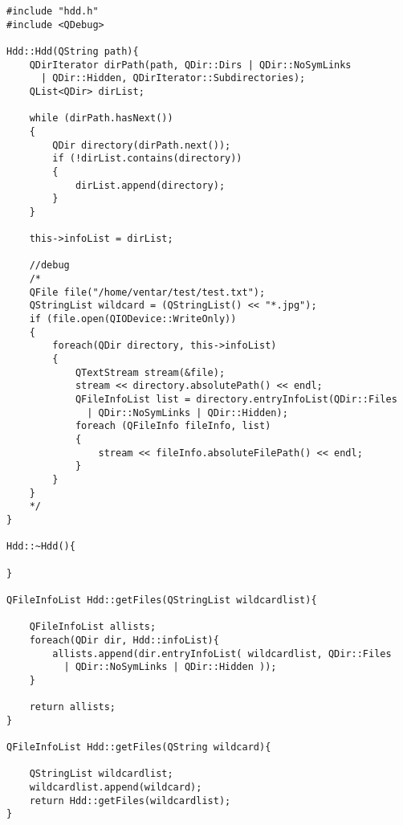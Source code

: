 \label{apx:hddclass}
\begin{lstlisting}
#include "hdd.h"
#include <QDebug>

Hdd::Hdd(QString path){
    QDirIterator dirPath(path, QDir::Dirs | QDir::NoSymLinks 
      | QDir::Hidden, QDirIterator::Subdirectories);
    QList<QDir> dirList;

    while (dirPath.hasNext())
    {
        QDir directory(dirPath.next());
        if (!dirList.contains(directory))
        {
            dirList.append(directory);
        }
    }

    this->infoList = dirList;

    //debug
    /*
    QFile file("/home/ventar/test/test.txt");
    QStringList wildcard = (QStringList() << "*.jpg");
    if (file.open(QIODevice::WriteOnly))
    {
        foreach(QDir directory, this->infoList)
        {
            QTextStream stream(&file);
            stream << directory.absolutePath() << endl;
            QFileInfoList list = directory.entryInfoList(QDir::Files 
              | QDir::NoSymLinks | QDir::Hidden);
            foreach (QFileInfo fileInfo, list)
            {
                stream << fileInfo.absoluteFilePath() << endl;
            }
        }
    }
    */
}

Hdd::~Hdd(){

}

QFileInfoList Hdd::getFiles(QStringList wildcardlist){

    QFileInfoList allists;
    foreach(QDir dir, Hdd::infoList){
        allists.append(dir.entryInfoList( wildcardlist, QDir::Files  
          | QDir::NoSymLinks | QDir::Hidden ));
    }

    return allists;
}

QFileInfoList Hdd::getFiles(QString wildcard){

    QStringList wildcardlist;
    wildcardlist.append(wildcard);
    return Hdd::getFiles(wildcardlist);
}
\end{lstlisting}

